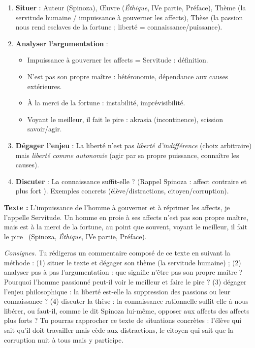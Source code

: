 \documentclass[11pt]{article}
\begin{document}
\begin{methode}
\begin{enumerate}
\item \textbf{Situer} : Auteur (Spinoza), Œuvre (\emph{Éthique}, IVe partie, Préface), Thème (la servitude humaine / impuissance à gouverner les affects), Thèse (la passion nous rend esclaves de la fortune ; liberté = connaissance/puissance).
\item \textbf{Analyser l'argumentation} :
\begin{itemize}
\item \guillemotleft Impuissance à gouverner les affects = Servitude \guillemotright : définition.
\item \guillemotleft N'est pas son propre maître \guillemotright : hétéronomie, dépendance aux causes extérieures.
\item \guillemotleft À la merci de la fortune \guillemotright : instabilité, imprévisibilité.
\item \guillemotleft Voyant le meilleur, il fait le pire \guillemotright : akrasia (incontinence), scission savoir/agir.
\end{itemize}
\item \textbf{Dégager l'enjeu} : La liberté n'est pas \emph{liberté d'indifférence} (choix arbitraire) mais \emph{liberté comme autonomie} (agir par sa propre puissance, connaître les causes).
\item \textbf{Discuter} : La connaissance suffit-elle ? (Rappel Spinoza : \guillemotleft affect contraire et plus fort \guillemotright). Exemples concrets (élève/distractions, citoyen/corruption).
\end{enumerate}
\end{methode}

\begin{exercice}
\textbf{Texte :} \guillemotleft L'impuissance de l'homme à gouverner et à réprimer les affects, je l'appelle Servitude. Un homme en proie à ses affects n'est pas son propre maître, mais est à la merci de la fortune, au point que souvent, voyant le meilleur, il fait le pire \guillemotright\ (Spinoza, \emph{Éthique}, IVe partie, Préface).

\textit{Consignes.} Tu rédigeras un commentaire composé de ce texte en suivant la méthode : (1) situer le texte et dégager son thème (la servitude humaine) ; (2) analyser pas à pas l'argumentation : que signifie \guillemotleft n'être pas son propre maître \guillemotright ? Pourquoi l'homme passionné peut-il \guillemotleft voir le meilleur et faire le pire \guillemotright ? (3) dégager l'enjeu philosophique : la liberté est-elle la suppression des passions ou leur connaissance ? (4) discuter la thèse : la connaissance rationnelle suffit-elle à nous libérer, ou faut-il, comme le dit Spinoza lui-même, opposer aux affects des affects plus forts ? Tu pourras rapprocher ce texte de situations concrètes : l'élève qui sait qu'il doit travailler mais cède aux distractions, le citoyen qui sait que la corruption nuit à tous mais y participe.
\end{exercice}
\end{document}

